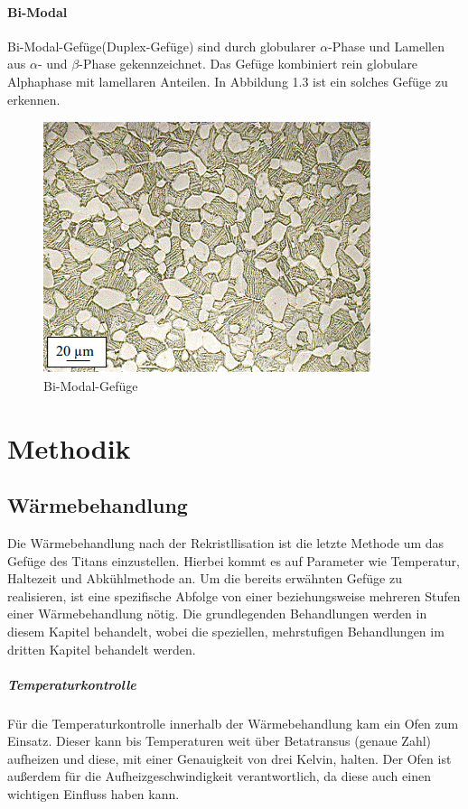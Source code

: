 \documentclass[a4paper, 11pt]{tubsreprt}
\begin{document}
\subsubsection{Bi-Modal}
Bi-Modal-Gefüge(Duplex-Gefüge) sind durch globularer $\alpha$-Phase und Lamellen aus $\alpha$- und $\beta$-Phase gekennzeichnet. Das Gefüge kombiniert rein globulare Alphaphase mit lamellaren Anteilen. In Abbildung 1.3 ist ein solches Gefüge zu erkennen. 
\begin{figure}
\centering
\includegraphics[scale=1]{Bilder/Duplexgefuege.PNG}
\caption[Bi-Modal-Gefüge]{Bi-Modal-Gefüge\cite{Werkstoffdesign2012}}
\label{fig5}
\end{figure}

\chapter{Methodik}
\section{Wärmebehandlung}

Die Wärmebehandlung nach der Rekristllisation ist die letzte Methode um das Gefüge des Titans einzustellen. Hierbei kommt es auf Parameter wie Temperatur, Haltezeit und Abkühlmethode an. Um die bereits erwähnten Gefüge zu realisieren, ist eine spezifische Abfolge von einer beziehungsweise mehreren Stufen einer Wärmebehandlung nötig. Die grundlegenden Behandlungen werden in diesem Kapitel behandelt, wobei die speziellen, mehrstufigen Behandlungen im dritten Kapitel behandelt werden.
\paragraph{Temperaturkontrolle}
Für die Temperaturkontrolle innerhalb der Wärmebehandlung kam ein Ofen zum Einsatz. Dieser kann bis Temperaturen weit über Betatransus (genaue Zahl) aufheizen und diese, mit einer Genauigkeit von drei Kelvin, halten. Der Ofen ist außerdem für die Aufheizgeschwindigkeit verantwortlich, da diese auch einen wichtigen Einfluss haben kann.
\end{document}
